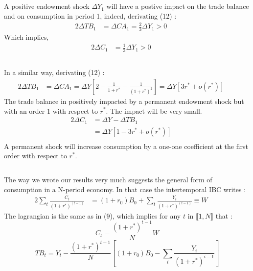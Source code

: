 \documentclass{article}
\begin{document}
\subsection{}
A positive endowment shock $\Delta Y_1$ will have a postive impact on the trade balance and on consumption in period 1, indeed, derivating (12) :
\begin{alignat}{2}
    \Delta TB_1 &= \Delta CA_1 = \frac{2}{3} \Delta Y_1  > 0 \quad&
\end{alignat}
Which implies,
\begin{alignat}{2}
    \Delta C_1 &= \frac{1}{3} \Delta Y_1  > 0 \quad&
\end{alignat}
\subsection{}
In a similar way, derivating (12) :
\begin{alignat}{2}
    \Delta TB_1 &= \Delta CA_1 = \Delta Y \left[2 - \frac{1}{1+r^*} - \frac{1}{(1+r^*)^2} \right] = \Delta Y \left[3 r^* + o(r^*)\right]\quad&
\end{alignat}
The trade balance in positively impacted by a permanent endowment shock but with an order 1 with respect to $r^*$. The impact will be very small.\newline
\begin{alignat*}{2}
    \Delta C_1 &= \Delta Y - \Delta TB_1 \quad&\\
    &= \Delta Y \left[1 - 3 r^* + o(r^*)\right]\quad&\\
\end{alignat*}
A permanent shock will increase consumption by a one-one coefficient at the first order with respect to $r^*$. 
\subsection{}
The way we wrote our results very much suggests the general form of consumption in a N-period economy.
In that case the intertemporal IBC writes :
\begin{alignat}{2}
    \sum_{t} \frac{C_t}{(1+r^*)^{(t-1)}} &= (1+r_0)B_0 + \sum_t \frac{Y_t}{(1+r^*)^{(t-1)}} \equiv W \quad&
\end{alignat}
The lagrangian is the same as in (9), which implies for any $t$ in $\llbracket 1, N \rrbracket$  that :
\begin{equation}{}
    C_t = \frac{(1+r^*)^{t-1}}{N}W 
\end{equation}
\begin{equation}{}
    TB_t = Y_t - \frac{(1+r^*)^{t-1}}{N} \left[ (1+r_0)B_0 - \sum_i \frac{Y_i}{(1+r^*)^{i-1}} \right]
\end{equation}
\end{document}
